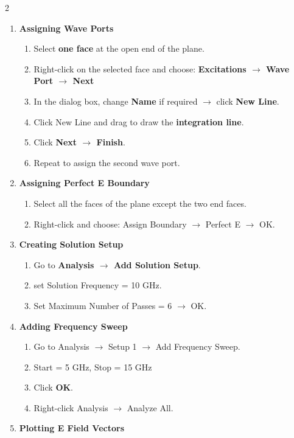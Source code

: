 \documentclass[11pt, a4paper]{article}
\begin{document}
\begin{multicols}{2}
\begin{enumerate}[leftmargin=*, itemsep=15pt]
\begin{enumerate}
			\item Choose \textbf{Edit $\rightarrow$ Boolean $\rightarrow$ Unite}
		\end{enumerate}
	\item \textbf{Assigning Wave Ports}
		\begin{enumerate}
			\item Select \textbf{one face} at the open end of the plane.
			\item Right-click on the selected face and choose: \textbf{Excitations $\rightarrow$ Wave Port $\rightarrow$ Next}
			\item In the dialog box, change \textbf{Name} if required $\rightarrow$ click \textbf{New Line}.
			\item Click New Line and drag to draw the \textbf{integration line}.
			\item Click \textbf{Next $\rightarrow$ Finish}.
			\item Repeat to assign the second wave port.
		\end{enumerate}
	\item \textbf{Assigning Perfect E Boundary}
		\begin{enumerate}
			\item Select all the faces of the plane except the two end faces.
			\item Right-click and choose: Assign Boundary $\rightarrow$ Perfect E $\rightarrow$ OK.
		\end{enumerate}
	\item \textbf{Creating Solution Setup}
		\begin{enumerate}
            \item Go to \textbf{Analysis $\rightarrow$ Add Solution Setup}.
			\item set Solution Frequency = 10 GHz.
			\item Set Maximum Number of Passes = 6 $\rightarrow$ OK.
		\end{enumerate}
	\item \textbf{Adding Frequency Sweep}
		\begin{enumerate}
            \item Go to Analysis $\rightarrow$ Setup 1 $\rightarrow$ Add Frequency Sweep.
			\item Start = 5 GHz, Stop = 15 GHz
			\item Click \textbf{OK}.
			\item Right-click Analysis $\rightarrow$ Analyze All.
		\end{enumerate}
	\item \textbf{Plotting E Field Vectors}

\end{enumerate}
\end{multicols}
\end{document}
